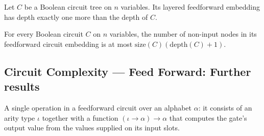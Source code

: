 \begin{theorem}
\label{BoolCircuit.TreeCircuit.toLayeredWrapper_depth}
\leanok
{}
Let $C$ be a Boolean circuit tree on $n$ variables. Its layered feedforward embedding
has depth exactly one more than the depth of $C$.
\end{theorem}

\begin{theorem}
\label{BoolCircuit.TreeCircuit.toLayeredWrapper_size_le}
\leanok
{}
For every Boolean circuit $C$ on $n$ variables, the number of non-input nodes in its
feedforward circuit embedding is at most $\mathrm{size}(C)(\mathrm{depth}(C)+1)$.
\end{theorem}

\subsection*{Circuit Complexity --- Feed Forward: Further results}

\begin{definition}
\label{BoolCircuit.GateOp}
\leanok
A single operation in a feedforward circuit over an alphabet $\alpha$: it consists
of an arity type $\iota$ together with a function $(\iota \to \alpha) \to \alpha$
that computes the gate's output value from the values supplied on its input slots.
\end{definition}
